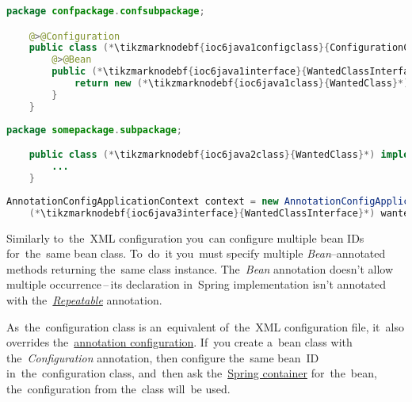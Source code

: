 \begin{lstlisting}[language=Java, title={Configuration class}]
    package confpackage.confsubpackage;

    @>@Configuration
    public class (*\tikzmarknodebf{ioc6java1configclass}{ConfigurationClass}*) {
        @>@Bean
        public (*\tikzmarknodebf{ioc6java1interface}{WantedClassInterface}*) (*\tikzmarknodebf{ioc6java1beanid}{wantedBeanMethod}*)() {
            return new (*\tikzmarknodebf{ioc6java1class}{WantedClass}*)();
        }
    }
\end{lstlisting}
\begin{lstlisting}[language=Java, title={Wanted class}]
    package somepackage.subpackage;

    public class (*\tikzmarknodebf{ioc6java2class}{WantedClass}*) implements (*\tikzmarknodebf{ioc6java2interface}{WantedClassInterface}*) {
        ...
    }
\end{lstlisting}
\begin{lstlisting}[language=Java, title={Usage}]
    AnnotationConfigApplicationContext context = new AnnotationConfigApplicationContext((*\tikzmarknodebf{ioc6java3configclass}{ConfigurationClass}*).class);
    (*\tikzmarknodebf{ioc6java3interface}{WantedClassInterface}*) wantedClassInstance = context.getBean("(*\tikzmarknodebf{ioc6java3beanid}{wantedBeanMethod}[ForestGreen]*)", (*\tikzmarknodebf{ioc6java3interface2}{WantedClassInterface}*).class);
\end{lstlisting}

\noindent Similarly to~the~XML configuration you~can configure multiple bean IDs for~the~same bean class. To~do~it you~must specify multiple \textit{Bean}--annotated methods returning the~same class instance. The~\textit{Bean} annotation doesn't allow multiple occurrence\,--\,its declaration in~Spring implementation isn't annotated with the~\hyperref[annotationsrepeatable]{\textit{Repeatable}} annotation.

\warning As~the~configuration class is an~equivalent of~the~XML configuration file, it~also overrides the~\hyperref[iocannotations]{annotation configuration}. If~you create a~bean class with the~\textit{Configuration} annotation, then configure the~same bean~ID in~the~configuration class, and~then ask the~\hyperref[springcontainrer]{Spring container} for~the~bean, the~configuration from the~class will~be used.
\newpage

